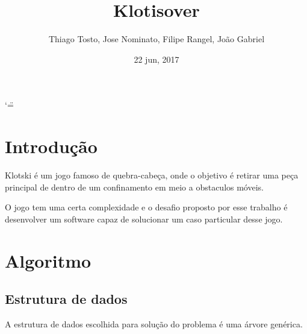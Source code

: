 \documentclass[letterpaper,10pt,openany,oneside,portuges]{sphinxmanual}
\title{Klotisover}
\date{22 jun, 2017}
\author{Thiago Tosto, Jose Nominato, Filipe Rangel, João Gabriel}
\begin{document}
\ifnum\catcode`\"=\active{}\fi
\maketitle
\sphinxtableofcontents
{}\label{\detokenize{index::doc}}



\chapter{Introdução}
\label{\detokenize{intro:introducao}}\label{\detokenize{intro:bem-vindo-a-documentacao-do-klotisover}}\label{\detokenize{intro::doc}}
\begin{DUlineblock}{0em}
\item[] Klotski é um jogo famoso de quebra-cabeça, onde o objetivo é retirar uma peça principal de dentro de um confinamento em meio a obstaculos móveis.
\end{DUlineblock}


\begin{DUlineblock}{0em}
\item[] 
\item[] 
\end{DUlineblock}

\begin{DUlineblock}{0em}
\item[] O jogo tem uma certa complexidade e o desafio proposto por esse trabalho é desenvolver um software capaz de solucionar um caso particular desse jogo.
\end{DUlineblock}



\chapter{Algoritmo}
\label{\detokenize{algoritmo::doc}}\label{\detokenize{algoritmo:algoritmo}}

\section{Estrutura de dados}
\label{\detokenize{algoritmo:estrutura-de-dados}}
\begin{DUlineblock}{0em}
\item[] A estrutura de dados escolhida para solução do problema é uma árvore genérica.
\end{DUlineblock}
\end{document}
